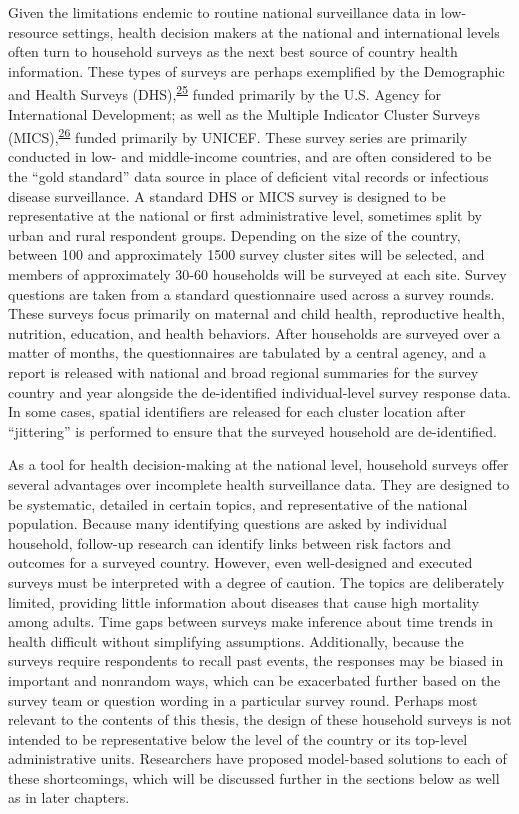 \documentclass[
]{article}
\begin{document}
Given the limitations endemic to routine national surveillance data in low-resource settings, health decision makers at the national and international levels often turn to household surveys as the next best source of country health information. These types of surveys are perhaps exemplified by the Demographic and Health Surveys (DHS),\textsuperscript{\protect\hyperlink{ref-Corsi2012}{25}} funded primarily by the U.S. Agency for International Development; as well as the Multiple Indicator Cluster Surveys (MICS),\textsuperscript{\protect\hyperlink{ref-Khan2019}{26}} funded primarily by UNICEF. These survey series are primarily conducted in low- and middle-income countries, and are often considered to be the ``gold standard'' data source in place of deficient vital records or infectious disease surveillance. A standard DHS or MICS survey is designed to be representative at the national or first administrative level, sometimes split by urban and rural respondent groups. Depending on the size of the country, between 100 and approximately 1500 survey cluster sites will be selected, and members of approximately 30-60 households will be surveyed at each site. Survey questions are taken from a standard questionnaire used across a survey rounds. These surveys focus primarily on maternal and child health, reproductive health, nutrition, education, and health behaviors. After households are surveyed over a matter of months, the questionnaires are tabulated by a central agency, and a report is released with national and broad regional summaries for the survey country and year alongside the de-identified individual-level survey response data. In some cases, spatial identifiers are released for each cluster location after ``jittering'' is performed to ensure that the surveyed household are de-identified.

As a tool for health decision-making at the national level, household surveys offer several advantages over incomplete health surveillance data. They are designed to be systematic, detailed in certain topics, and representative of the national population. Because many identifying questions are asked by individual household, follow-up research can identify links between risk factors and outcomes for a surveyed country. However, even well-designed and executed surveys must be interpreted with a degree of caution. The topics are deliberately limited, providing little information about diseases that cause high mortality among adults. Time gaps between surveys make inference about time trends in health difficult without simplifying assumptions. Additionally, because the surveys require respondents to recall past events, the responses may be biased in important and nonrandom ways, which can be exacerbated further based on the survey team or question wording in a particular survey round. Perhaps most relevant to the contents of this thesis, the design of these household surveys is not intended to be representative below the level of the country or its top-level administrative units. Researchers have proposed model-based solutions to each of these shortcomings, which will be discussed further in the sections below as well as in later chapters.
\end{document}
